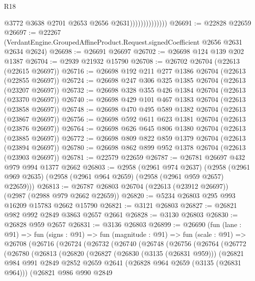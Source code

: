 \begin{lexlean}{R18}
\begin{coremodule}
                                @3772
                                @3638
                                @2701
                                @2653
                                @2656
                                @2631))))))))))))))
@26691 := @22828 @22659
@26697 := @22267
    (VerdantEngine.GroupedAffineProduct.Request.signedCoefficient @2656 @2631 @2634 @2624)
@26698 := @26691 @26697
@26702 := @26698 @124 @139 @202 @1387
@26704 := @2939 @21932 @15790
@26708 := @26702 @26704 (@22613 (@22615 @26697))
@26716 := @26698 @192 @211 @277 @1386 @26704 (@22613 (@22855 @26697))
@26724 := @26698 @247 @306 @325 @1385 @26704 (@22613 (@23207 @26697))
@26732 := @26698 @328 @355 @426 @1384 @26704 (@22613 (@23370 @26697))
@26740 := @26698 @429 @101 @467 @1383 @26704 (@22613 (@23858 @26697))
@26748 := @26698 @470 @495 @589 @1382 @26704 (@22613 (@23867 @26697))
@26756 := @26698 @592 @611 @623 @1381 @26704 (@22613 (@23876 @26697))
@26764 := @26698 @626 @645 @806 @1380 @26704 (@22613 (@23885 @26697))
@26772 := @26698 @809 @822 @859 @1379 @26704 (@22613 (@23894 @26697))
@26780 := @26698 @862 @899 @952 @1378 @26704 (@22613 (@23903 @26697))
@26781 := @22579 @22659
@26787 := @26781 @26697 @432 @979 @994 @1377 @2662
@26803 := @2958
    (@2961 @974 @2637)
    (@2958 (@2961 @969 @2635) (@2958 (@2961 @964 @2659) (@2958 (@2961 @959 @2657) @22659)))
@26813 := @26787 @26803 @26704 (@22613 (@23912 @26697)) (@2987 (@2988 @979 @2662 @22659))
@26820 := @5234 @26803 @295 @993 @16209 @15783 @2662 @15790
@26821 := @3121 @26803
@26827 := @26821 @982 @992 @2849 @3863 @2657 @2661
@26828 := @3130 @26803
@26830 := @26828 @959 @2657
@26831 := @3136 @26803
@26899 := @26690
    (fun (lane : @91) =>
    fun (signs : @91) =>
    fun (magnitude : @91) =>
    fun (scale : @91) =>
    @26708
      (@26716
        (@26724
          (@26732
            (@26740
              (@26748
                (@26756
                  (@26764
                    (@26772
                      (@26780
                        (@26813
                          (@26820
                            (@26827
                              (@26830 (@3135 (@26831 @959)))
                              (@26821
                                @984
                                @991
                                @2849
                                @2852
                                @2659
                                @2641
                                (@26828 @964 @2659 (@3135 (@26831 @964)))
                                (@26821
                                  @986
                                  @990
                                  @2849

\end{coremodule}
\end{lexlean}
